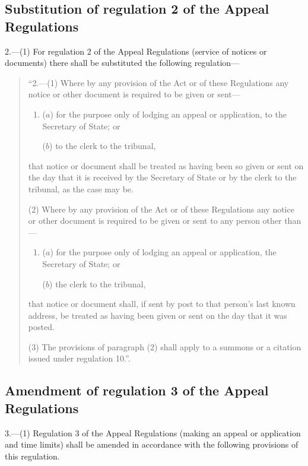 \documentclass[a4paper]{article}
\begin{document}
\subsection[2. Substitution of regulation 2 of the Appeal Regulations]{Substitution of regulation 2 of the Appeal Regulations}

2.—(1) For regulation 2 of the Appeal Regulations (service of notices or documents) there shall be substituted the following regulation—
\begin{quotation}
“2.—(1) Where by any provision of the Act or of these Regulations any notice or other document is required to be given or sent—
\begin{enumerate}\item[]
($a$) for the purpose only of lodging an appeal or application, to the Secretary of State; or

($b$) to the clerk to the tribunal,
\end{enumerate}
that notice or document shall be treated as having been so given or sent on the day that it is received by the Secretary of State or by the clerk to the tribunal, as the case may be.

(2) Where by any provision of the Act or of these Regulations any notice or other document is required to be given or sent to any person other than—
\begin{enumerate}\item[]
($a$) for the purpose only of lodging an appeal or application, the Secretary of State; or

($b$) the clerk to the tribunal,
\end{enumerate}
that notice or document shall, if sent by post to that person’s last known address, be treated as having been given or sent on the day that it was posted.

(3) The provisions of paragraph (2) shall apply to a summons or a citation issued under regulation 10.”.
\end{quotation}

\subsection[3. Amendment of regulation 3 of the Appeal Regulations]{Amendment of regulation 3 of the Appeal Regulations}

3.—(1) Regulation 3 of the Appeal Regulations (making an appeal or application and time limits) shall be amended in accordance with the following provisions of this regulation.
\end{document}
